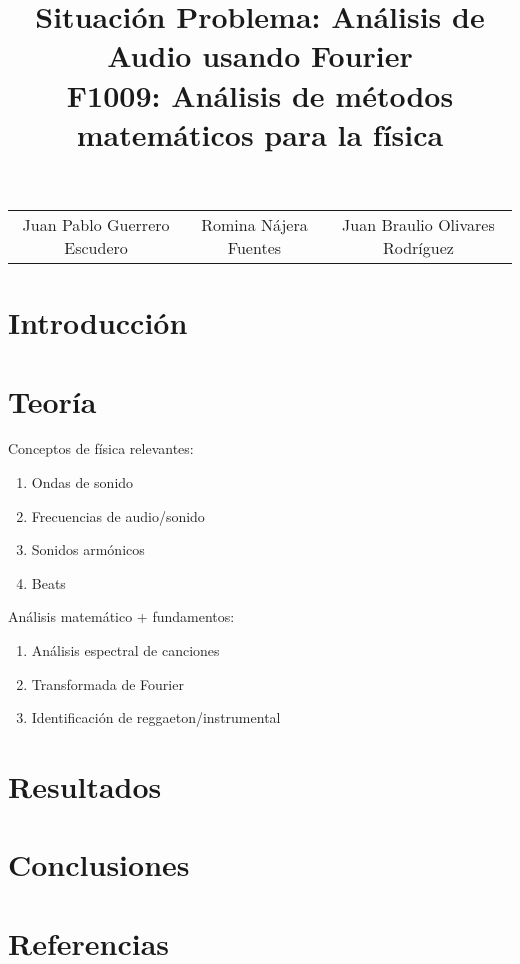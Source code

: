 \documentclass[12pt, letterpaper]{article}
\title{%
  Situación Problema: Análisis de Audio usando Fourier \\
  \large F1009: Análisis de métodos matemáticos para la física}
\begin{document}
\maketitle

\begin{tabular}{ccc}
Juan Pablo Guerrero Escudero & Romina Nájera Fuentes & Juan Braulio Olivares Rodríguez
\end{tabular}

\section*{Introducción}

\section*{Teoría}

Conceptos de física relevantes:
\begin{enumerate}
    \item Ondas de sonido
    \item Frecuencias de audio/sonido
    \item Sonidos armónicos
    \item Beats
\end{enumerate}

\noindent Análisis matemático + fundamentos:
\begin{enumerate}
    \item Análisis espectral de canciones
    \item Transformada de Fourier
    \item Identificación de reggaeton/instrumental
\end{enumerate}



\section*{Resultados}

\section*{Conclusiones}

\section*{Referencias}
\end{document}
